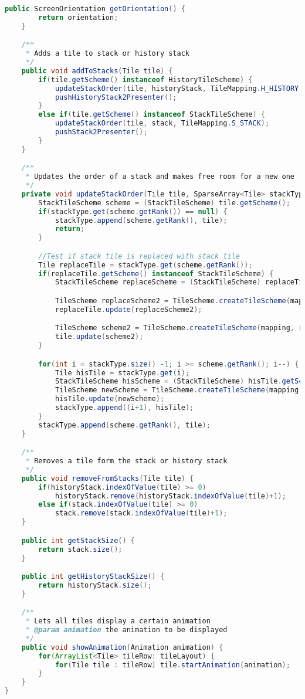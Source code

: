 \begin{lstlisting}[caption=TileLayout,label=list:TileLayout,language=Java]
    public ScreenOrientation getOrientation() {
        return orientation;
    }

    /**
     * Adds a tile to stack or history stack
     */
    public void addToStacks(Tile tile) {
        if(tile.getScheme() instanceof HistoryTileScheme) {
            updateStackOrder(tile, historyStack, TileMapping.H_HISTORY);
            pushHistoryStack2Presenter();
        }
        else if(tile.getScheme() instanceof StackTileScheme) {
            updateStackOrder(tile, stack, TileMapping.S_STACK);
            pushStack2Presenter();
        }
    }

    /**
     * Updates the order of a stack and makes free room for a new one
     */
    private void updateStackOrder(Tile tile, SparseArray<Tile> stackType, TileMapping mapping) {
        StackTileScheme scheme = (StackTileScheme) tile.getScheme();
        if(stackType.get(scheme.getRank()) == null) {
            stackType.append(scheme.getRank(), tile);
            return;
        }

        //Test if stack tile is replaced with stack tile
        Tile replaceTile = stackType.get(scheme.getRank());
        if(replaceTile.getScheme() instanceof StackTileScheme) {
            StackTileScheme replaceScheme = (StackTileScheme) replaceTile.getScheme();

            TileScheme replaceScheme2 = TileScheme.createTileScheme(mapping, scheme.getOperand(), replaceScheme.getRank());
            replaceTile.update(replaceScheme2);

            TileScheme scheme2 = TileScheme.createTileScheme(mapping, replaceScheme.getOperand(), scheme.getRank());
            tile.update(scheme2);
        }

        for(int i = stackType.size() -1; i >= scheme.getRank(); i--) {
            Tile hisTile = stackType.get(i);
            StackTileScheme hisScheme = (StackTileScheme) hisTile.getScheme();
            TileScheme newScheme = TileScheme.createTileScheme(mapping, hisScheme.getOperand(), (i + 1));
            hisTile.update(newScheme);
            stackType.append((i+1), hisTile);
        }
        stackType.append(scheme.getRank(), tile);
    }

    /**
     * Removes a tile form the stack or history stack
     */
    public void removeFromStacks(Tile tile) {
        if(historyStack.indexOfValue(tile) >= 0)
            historyStack.remove(historyStack.indexOfValue(tile)+1);
        else if(stack.indexOfValue(tile) >= 0)
            stack.remove(stack.indexOfValue(tile)+1);
    }

    public int getStackSize() {
        return stack.size();
    }

    public int getHistoryStackSize() {
        return historyStack.size();
    }

    /**
     * Lets all tiles display a certain animation
     * @param animation the animation to be displayed
     */
    public void showAnimation(Animation animation) {
        for(ArrayList<Tile> tileRow: tileLayout) {
            for(Tile tile : tileRow) tile.startAnimation(animation);
        }
    }
}
\end{lstlisting}    

